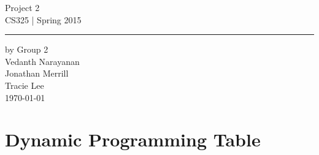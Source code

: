 \documentclass[11pt,letterpaper]{article}
\begin{document}
\begin{titlepage}
    \vspace*{4cm}
    \begin{flushright}
    {\huge
        Project 2\\[5mm]
    }
    {\large
        CS325 | Spring 2015
     }
    \end{flushright}
\hrule
    \begin{flushright}
	by Group 2\\
	Vedanth Narayanan\\
	Jonathan Merrill\\
	Tracie Lee\\
    \vfill
	\today\\
    \end{flushright}
\end{titlepage}

\raggedright

\section*{Dynamic Programming Table}
\end{document}
